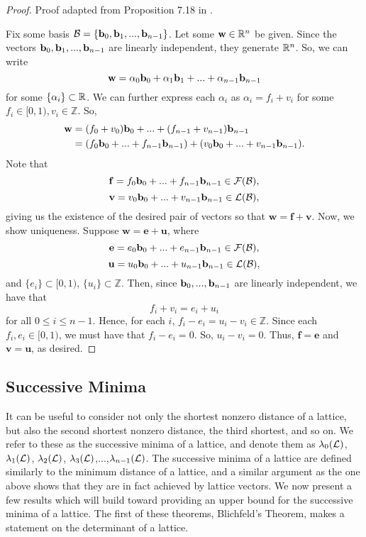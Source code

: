 \documentclass[a4paper,12pt]{article}
\begin{document}
\begin{proof}
    Proof adapted from Proposition 7.18 in \cite{HPS}. 
    
    Fix some basis $\mathcal{B} = \lbrace \mathbf{b}_0, \mathbf{b}_1,...,\mathbf{b}_{n-1}\rbrace$. Let some $\mathbf{w} \in \mathbb{R}^n$ be given. Since the vectors $\mathbf{b}_0,\mathbf{b}_1,...,\mathbf{b}_{n-1}$ are linearly independent, they generate $\mathbb{R}^n$. So, we can write $$\mathbf{w} = \alpha_0\mathbf{b}_0 + \alpha_1\mathbf{b}_1 + ... + \alpha_{n-1}\mathbf{b}_{n-1}$$ for some $\lbrace \alpha_i \rbrace \subset \mathbb{R}$. We can further express each $\alpha_i$ as $\alpha_i = f_i + v_i$ for some $f_i \in [0,1), v_i \in \mathbb{Z}$. So, 
    \begin{align*}
        \mathbf{w} &= (f_0 + v_0)\mathbf{b}_0 + ... + (f_{n-1} + v_{n-1})\mathbf{b}_{n-1} \\
                   &= (f_0\mathbf{b}_0 + ... + f_{n-1}\mathbf{b}_{n-1}) + (v_0\mathbf{b}_0 + ... + v_{n-1}\mathbf{b}_{n-1}).
    \end{align*}
    Note that $$\mathbf{f} = f_0\mathbf{b}_0 + ... + f_{n-1}\mathbf{b}_{n-1} \in \mathcal{F}(\mathcal{B}),$$ $$\mathbf{v} = v_0\mathbf{b}_0 + ... + v_{n-1}\mathbf{b}_{n-1} \in \mathcal{L}(\mathcal{B}),$$ giving us the existence of the desired pair of vectors so that $\mathbf{w} = \mathbf{f} + \mathbf{v}$. Now, we show uniqueness. Suppose $\mathbf{w} = \mathbf{e} + \mathbf{u}$, where $$\mathbf{e} = {e_0}\mathbf{b}_0 + ... + e_{n-1}\mathbf{b}_{n-1} \in \mathcal{F}(\mathcal{B}),$$ $$\mathbf{u} = u_0\mathbf{b}_0 + ... + u_{n-1}\mathbf{b}_{n-1} \in \mathcal{L}(\mathcal{B}),$$ and $\lbrace e_i \rbrace \subset [0,1)$, $\lbrace u_i \rbrace \subset \mathbb{Z}$.  Then, since $\mathbf{b}_0, ..., \mathbf{b}_{n-1}$ are linearly independent, we have that $$f_i + v_i = e_i + u_i$$ for all $0 \leq i \leq n-1$. Hence, for each $i$, $f_i - e_i = u_i - v_i \in \mathbb{Z}$. Since each $f_i,e_i \in [0,1)$, we must have that $f_i - e_i = 0$. So, $u_i - v_i = 0$. Thus, $\mathbf{f} = \mathbf{e}$ and $\mathbf{v} = \mathbf{u}$, as desired. 
\end{proof}

\subsection{Successive Minima}

It can be useful to consider not only the shortest nonzero distance of a lattice, but also the second shortest nonzero distance, the third shortest, and so on. We refer to these as the successive minima of a lattice, and denote them as $\lambda_{0}(\mathcal{L})$, $\lambda_{1}(\mathcal{L})$, $\lambda_{2}(\mathcal{L})$, $\lambda_{3}(\mathcal{L})$,...,$\lambda_{n-1}(\mathcal{L})$. The successive minima of a lattice are defined similarly to the minimum distance of a lattice, and a similar argument as the one above shows that they are in fact achieved by lattice vectors. We now present a few results which will build toward providing an upper bound for the successive minima of a lattice. The first of these theorems, Blichfeld's Theorem, makes a statement on the determinant of a lattice. 
\end{document}
